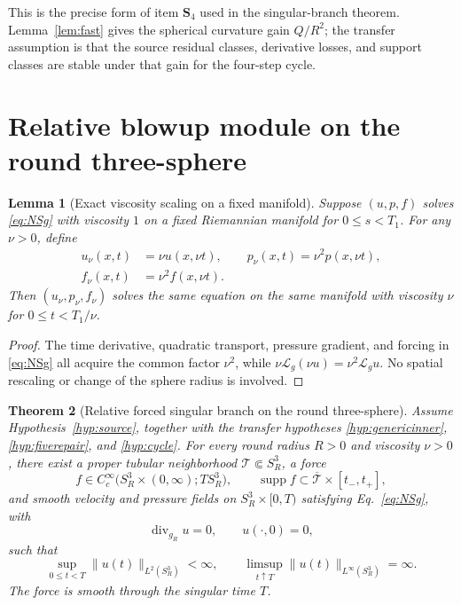 \documentclass[aps,prd,reprint,superscriptaddress,nofootinbib,floatfix]{revtex4-2}
\newtheorem{theorem}{Theorem}
\newtheorem{lemma}[theorem]{Lemma}
\theoremstyle{definition}
\theoremstyle{remark}
\newcommand{\cL}{\mathcal{L}}
\begin{document}
This is the precise form of item \(\mathbf S_4\) used in the singular-branch theorem.  Lemma~\ref{lem:fast} gives the spherical curvature gain \(Q/R^2\); the transfer assumption is that the source residual classes, derivative losses, and support classes are stable under that gain for the four-step cycle.


\section{Relative blowup module on the round three-sphere}\label{sec:mainthm}

\begin{lemma}[Exact viscosity scaling on a fixed manifold]\label{lem:nuscale}
	Suppose $(u,p,f)$ solves \eqref{eq:NSg} with viscosity $1$ on a fixed Riemannian manifold for $0\le s<T_1$. For any $\nu>0$, define
	\begin{align}
		u_\nu(x,t) & =\nu u(x,\nu t),\qquad
		p_\nu(x,t)=\nu^2p(x,\nu t),\nonumber \\
		f_\nu(x,t) & =\nu^2f(x,\nu t).
		\label{eq:nuscale}
	\end{align}
	Then $(u_\nu,p_\nu,f_\nu)$ solves the same equation on the \emph{same} manifold with viscosity $\nu$ for $0\le t<T_1/\nu$.
\end{lemma}

\begin{proof}
	The time derivative, quadratic transport, pressure gradient, and forcing in \eqref{eq:NSg} all acquire the common factor $\nu^2$, while $\nu\cL_g(\nu u)=\nu^2\cL_g u$. No spatial rescaling or change of the sphere radius is involved.
\end{proof}

\begin{theorem}[Relative forced singular branch on the round three-sphere]\label{thm:S3}
	Assume Hypothesis~\ref{hyp:source}, together with the transfer hypotheses \ref{hyp:genericinner}, \ref{hyp:fiverepair}, and \ref{hyp:cycle}.  For every round radius $R>0$ and viscosity $\nu>0$, there exist a proper tubular neighborhood $\mathcal T\Subset S^3_R$, a force
	\begin{equation}
		f\in C_c^\infty\bigl(S^3_R\times(0,\infty);TS^3_R\bigr),
		\qquad \operatorname{supp}f\subset\overline{\mathcal T}\times[t_-,t_+],
		\label{eq:compactforce}
	\end{equation}
	and smooth velocity and pressure fields on $S^3_R\times[0,T)$ satisfying Eq.~\eqref{eq:NSg}, with
	\begin{equation}
		\operatorname{div}_{g_R}u=0,\qquad u(\cdot,0)=0,
	\end{equation}
	such that
	\begin{equation}
		\sup_{0\le t<T}\|u(t)\|_{L^2(S^3_R)}<\infty,
		\qquad
		\limsup_{t\uparrow T}\|u(t)\|_{L^\infty(S^3_R)}=\infty.
		\label{eq:S3blowup}
	\end{equation}
	The force is smooth through the singular time $T$.
\end{theorem}
\end{document}
